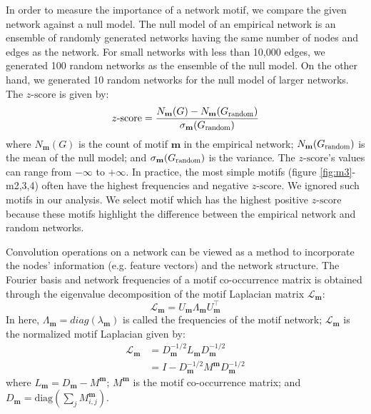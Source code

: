 \documentclass{article}
\theoremstyle{definition}
\begin{document}
In order to measure the importance of a network motif, we compare
the given network against a null model. The null model of an empirical 
network is an ensemble of randomly generated networks having the same 
number of nodes and edges as the network. For small networks with less 
than 10,000 edges, we generated 100 random networks as the ensemble of the 
null model. On the other hand, we generated 10 random networks for the 
null model of larger networks. The $z\mbox{-score}$ is given by:
\begin{equation*}
z\mbox{-score} = \frac{N_\mathbf{m}(G)-N_\mathbf{m}(G_{\scalebox{0.75}{random}})}{\sigma_\mathbf{m}(G_{\scalebox{0.75}{random}})}
\end{equation*}
where $N_\mathbf{m}(G)$ is the count of motif $\mathbf{m}$ in the 
empirical network; $N_\mathbf{m}(G_{\scalebox{0.75}{random}})$ is the mean 
of the null model; and $\sigma_\mathbf{m}(G_{\scalebox{0.75}{random}})$ is
the variance. The $z\mbox{-score}$'s values can range from 
$-\infty$ to $+\infty$. In practice, the most simple motifs (figure 
\ref{fig:m3}-m2,3,4) often have the highest frequencies and negative $z
\mbox{-score}$. We ignored such motifs in our analysis. We select motif 
which has the highest positive $z\mbox{-score}$ because these motifs
highlight the difference between the empirical network and random 
networks. 

Convolution operations on a network can be viewed as a method to
incorporate the nodes' information (e.g. feature vectors) 
and the network structure. The Fourier basis and network frequencies of
a motif co-occurrence matrix is obtained through the eigenvalue
decomposition of the motif Laplacian matrix $\mathcal{L}_{\mathbf{m}}$:
\begin{equation} \label{eq:eigm}
\mathcal{L}_{\mathbf{m}} = U_{\mathbf{m}} \Lambda_{\mathbf{m}} 
U^{\top}_{\mathbf{m}}
\end{equation}
In here, $\Lambda_{\mathbf{m}} = diag(\lambda_{\mathbf{m}})$ is called the 
frequencies of the motif network; $\mathcal{L}_{\mathbf{m}}$ is the 
normalized motif Laplacian given by:
\begin{equation} \label{eq:eigm}
\begin{aligned}
\mathcal{L}_{\mathbf{m}} &= D_{\mathbf{m}}^{-1/2} L_{\mathbf{m}} 
D_{\mathbf{m}}^{-1/2} \\
&= I - D_{\mathbf{m}}^{-1/2} M^{\mathbf{m}} D_{\mathbf{m}}^{-1/2}
\end{aligned}
\end{equation}
where $L_{\mathbf{m}} = D_{\mathbf{m}} - M^{\mathbf{m}}$; $M^{\mathbf{m}}$
is the motif co-occurrence matrix; and $D_{\mathbf{m}} = \mbox{diag} 
( \sum_j M^{\mathbf{m}}_{i,j} )$.
\end{document}
